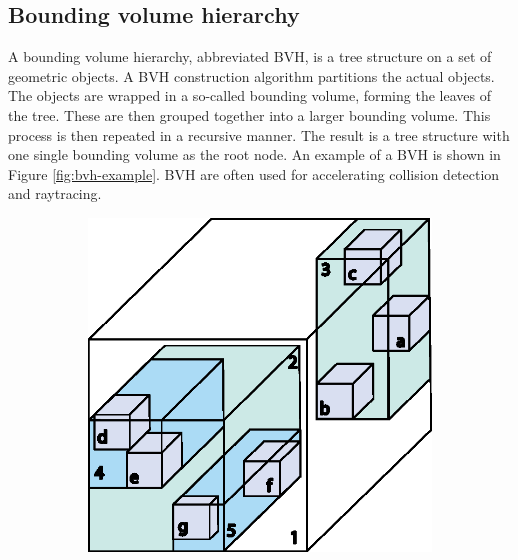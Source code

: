 \subsection{Bounding volume hierarchy}
\label{sec:theory-bounding-volume-hierarchy}
A bounding volume hierarchy, abbreviated BVH, is a tree structure on a set of geometric objects. A BVH construction algorithm partitions the actual objects. The objects are wrapped in a so-called bounding volume, forming the leaves of the tree. These are then grouped together into a larger bounding volume. This process is then repeated in a recursive manner. The result is a tree structure with one single bounding volume as the root node. An example of a BVH is shown in Figure \ref{fig:bvh-example}. BVH are often used for accelerating collision detection and raytracing.

\begin{figure}[ht]
    \centering
    \begin{subfigure}[c]{0.37\textwidth}
        \vspace{0pt}
        \centering
        \includegraphics[width=\textwidth]{sections/theory/figures/bvh-cube.eps}
    \end{subfigure}
    \hspace{1cm}
    \begin{subfigure}[c]{0.45\textwidth}
        \vspace{0pt}

\end{subfigure}
\end{figure}
